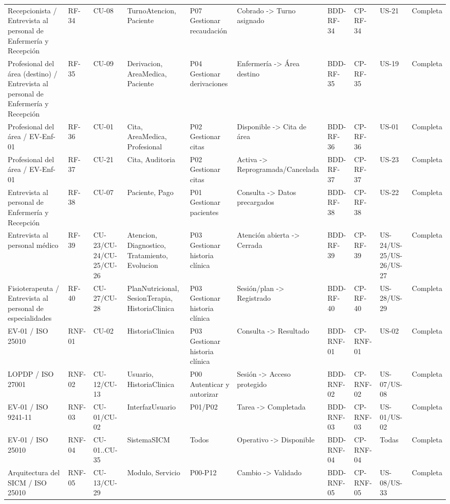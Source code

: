 \documentclass[11pt,a4paper]{article}
\begin{document}
\begin{appendices}
\begin{landscape}
\begin{longtable}{p{2.2cm}p{1.8cm}p{2cm}p{3cm}p{3cm}p{3cm}p{2cm}p{2cm}p{2cm}p{1.6cm}}
			Recepcionista / Entrevista al personal de Enfermería y Recepción & RF-34 & CU-08 & TurnoAtencion, Paciente & P07 Gestionar recaudación & Cobrado -> Turno asignado & BDD-RF-34 & CP-RF-34 & US-21 & Completa\\
			Profesional del área (destino) / Entrevista al personal de Enfermería y Recepción & RF-35 & CU-09 & Derivacion, AreaMedica, Paciente & P04 Gestionar derivaciones & Enfermería -> Área destino & BDD-RF-35 & CP-RF-35 & US-19 & Completa\\
			Profesional del área / EV-Enf-01 & RF-36 & CU-01 & Cita, AreaMedica, Profesional & P02 Gestionar citas & Disponible -> Cita de área & BDD-RF-36 & CP-RF-36 & US-01 & Completa\\
			Profesional del área / EV-Enf-01 & RF-37 & CU-21 & Cita, Auditoria & P02 Gestionar citas & Activa -> Reprogramada/Cancelada & BDD-RF-37 & CP-RF-37 & US-23 & Completa\\
			Entrevista al personal de Enfermería y Recepción & RF-38 & CU-07 & Paciente, Pago & P01 Gestionar pacientes & Consulta -> Datos precargados & BDD-RF-38 & CP-RF-38 & US-22 & Completa\\
			Entrevista al personal médico & RF-39 & CU-23/CU-24/CU-25/CU-26 & Atencion, Diagnostico, Tratamiento, Evolucion & P03 Gestionar historia clínica & Atención abierta -> Cerrada & BDD-RF-39 & CP-RF-39 & US-24/US-25/US-26/US-27 & Completa\\
			Fisioterapeuta / Entrevista al personal de especialidades & RF-40 & CU-27/CU-28 & PlanNutricional, SesionTerapia, HistoriaClinica & P03 Gestionar historia clínica & Sesión/plan -> Registrado & BDD-RF-40 & CP-RF-40 & US-28/US-29 & Completa\\
			EV-01 / ISO 25010 & RNF-01 & CU-02 & HistoriaClinica & P03 Gestionar historia clínica & Consulta -> Resultado & BDD-RNF-01 & CP-RNF-01 & US-02 & Completa\\
			LOPDP / ISO 27001 & RNF-02 & CU-12/CU-13 & Usuario, HistoriaClinica & P00 Autenticar y autorizar & Sesión -> Acceso protegido & BDD-RNF-02 & CP-RNF-02 & US-07/US-08 & Completa\\
			EV-01 / ISO 9241-11 & RNF-03 & CU-01/CU-02 & InterfazUsuario & P01/P02 & Tarea -> Completada & BDD-RNF-03 & CP-RNF-03 & US-01/US-02 & Completa\\
			EV-01 / ISO 25010 & RNF-04 & CU-01..CU-35 & SistemaSICM & Todos & Operativo -> Disponible & BDD-RNF-04 & CP-RNF-04 & Todas & Completa\\
			Arquitectura del SICM / ISO 25010 & RNF-05 & CU-13/CU-29 & Modulo, Servicio & P00-P12 & Cambio -> Validado & BDD-RNF-05 & CP-RNF-05 & US-08/US-33 & Completa\\

\end{longtable}
\end{landscape}
\end{appendices}
\end{document}
